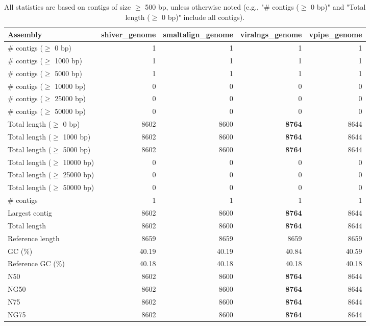 \documentclass[12pt,a4paper]{article}
\begin{document}
\begin{table}[ht]
\begin{center}
\caption{All statistics are based on contigs of size $\geq$ 500 bp, unless otherwise noted (e.g., "\# contigs ($\geq$ 0 bp)" and "Total length ($\geq$ 0 bp)" include all contigs).}
\begin{tabular}{|l*{4}{|r}|}
\hline
Assembly & shiver\_genome & smaltalign\_genome & viralngs\_genome & vpipe\_genome \\ \hline
\# contigs ($\geq$ 0 bp) & 1 & 1 & 1 & 1 \\ \hline
\# contigs ($\geq$ 1000 bp) & 1 & 1 & 1 & 1 \\ \hline
\# contigs ($\geq$ 5000 bp) & 1 & 1 & 1 & 1 \\ \hline
\# contigs ($\geq$ 10000 bp) & 0 & 0 & 0 & 0 \\ \hline
\# contigs ($\geq$ 25000 bp) & 0 & 0 & 0 & 0 \\ \hline
\# contigs ($\geq$ 50000 bp) & 0 & 0 & 0 & 0 \\ \hline
Total length ($\geq$ 0 bp) & 8602 & 8600 & {\bf 8764} & 8644 \\ \hline
Total length ($\geq$ 1000 bp) & 8602 & 8600 & {\bf 8764} & 8644 \\ \hline
Total length ($\geq$ 5000 bp) & 8602 & 8600 & {\bf 8764} & 8644 \\ \hline
Total length ($\geq$ 10000 bp) & 0 & 0 & 0 & 0 \\ \hline
Total length ($\geq$ 25000 bp) & 0 & 0 & 0 & 0 \\ \hline
Total length ($\geq$ 50000 bp) & 0 & 0 & 0 & 0 \\ \hline
\# contigs & 1 & 1 & 1 & 1 \\ \hline
Largest contig & 8602 & 8600 & {\bf 8764} & 8644 \\ \hline
Total length & 8602 & 8600 & {\bf 8764} & 8644 \\ \hline
Reference length & 8659 & 8659 & 8659 & 8659 \\ \hline
GC (\%) & 40.19 & 40.19 & 40.84 & 40.59 \\ \hline
Reference GC (\%) & 40.18 & 40.18 & 40.18 & 40.18 \\ \hline
N50 & 8602 & 8600 & {\bf 8764} & 8644 \\ \hline
NG50 & 8602 & 8600 & {\bf 8764} & 8644 \\ \hline
N75 & 8602 & 8600 & {\bf 8764} & 8644 \\ \hline
NG75 & 8602 & 8600 & {\bf 8764} & 8644 \\ \hline

\end{tabular}
\end{center}
\end{table}
\end{document}

